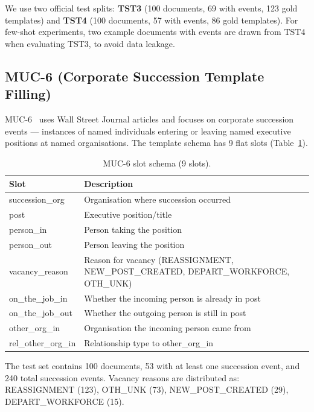 \documentclass[11pt,a4paper]{article}
\begin{document}
We use two official test splits: \textbf{TST3} (100 documents, 69 with events, 123 gold templates) and \textbf{TST4} (100 documents, 57 with events, 86 gold templates). For few-shot experiments, two example documents with events are drawn from TST4 when evaluating TST3, to avoid data leakage.

\subsection{MUC-6 (Corporate Succession Template Filling)}

MUC-6~\cite{grishman1996muc6} uses Wall Street Journal articles and focuses on corporate succession events — instances of named individuals entering or leaving named executive positions at named organisations. The template schema has 9 flat slots (Table~\ref{tab:muc6_slots}).

\begin{table}[h]
\centering
\caption{MUC-6 slot schema (9 slots).}
\label{tab:muc6_slots}
\small
\begin{tabular}{ll}
\toprule
\textbf{Slot} & \textbf{Description} \\
\midrule
succession\_org & Organisation where succession occurred \\
post & Executive position/title \\
person\_in & Person taking the position \\
person\_out & Person leaving the position \\
vacancy\_reason & Reason for vacancy (REASSIGNMENT, NEW\_POST\_CREATED, DEPART\_WORKFORCE, OTH\_UNK) \\
on\_the\_job\_in & Whether the incoming person is already in post \\
on\_the\_job\_out & Whether the outgoing person is still in post \\
other\_org\_in & Organisation the incoming person came from \\
rel\_other\_org\_in & Relationship type to other\_org\_in \\
\bottomrule
\end{tabular}
\end{table}

The test set contains 100 documents, 53 with at least one succession event, and 240 total succession events. Vacancy reasons are distributed as: REASSIGNMENT (123), OTH\_UNK (73), NEW\_POST\_CREATED (29), DEPART\_WORKFORCE (15).

\end{document}
